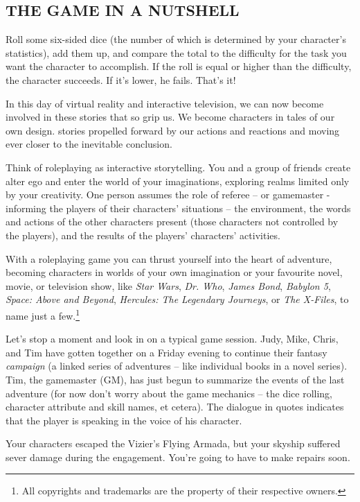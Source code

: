 \documentclass[10pt, a4paper, twoside]{book}
\begin{document}
\begin{multicols}{2}
\begin{mytextbox}
			\subsection*{THE GAME IN A NUTSHELL}
			Roll some six-sided dice (the number of which is determined by your character's statistics), add them up, and compare the total to the difficulty for the task you want the character to accomplish. If the roll is equal or higher than the difficulty, the character succeeds. If it's lower, he fails. That's it!
		\end{mytextbox}	
		In this day of virtual reality and interactive television, we can now become involved in these stories that so grip us. We become characters in tales of our own design. stories propelled forward by our actions and reactions and moving ever closer to the inevitable conclusion.\par Think of roleplaying as interactive storytelling. You and a group of friends create alter ego and enter the world of your imaginations, exploring realms limited only by your creativity. One person assumes the role of referee -- or gamemaster - informing the players of their characters' situations -- the environment, the words and actions of the other characters present (those characters not controlled by the players), and the results of the players' characters' activities. \par 
		With a roleplaying game you can thrust yourself into the heart of adventure, becoming characters in worlds of your own imagination or your favourite novel, movie, or television show, like \textit{Star Wars}, \textit{Dr. Who}, \textit{James Bond}, \textit{Babylon 5}, \textit{Space: Above and Beyond}, \textit{Hercules: The Legendary Journeys}, or \textit{The X-Files}, to name just a few.\footnote{All copyrights and trademarks are the property of their respective owners.} \par Let's stop a moment and look in on a typical game session. Judy, Mike, Chris, and Tim have gotten together on a Friday evening to continue their fantasy \textit{campaign} (a linked series of adventures -- like individual books in a novel series). Tim, the gamemaster (GM), has just begun to summarize the events of the last adventure (for now don't worry about the game mechanics -- the dice rolling, character attribute and skill names, et cetera). The dialogue in quotes indicates that the player is speaking in the voice of his character. 
		\begin{dialogue}
			 Your characters escaped the Vizier's Flying Armada, but your skyship suffered sever damage during the engagement. You're going to have to make repairs soon.

\end{dialogue}
\end{multicols}
\end{document}
